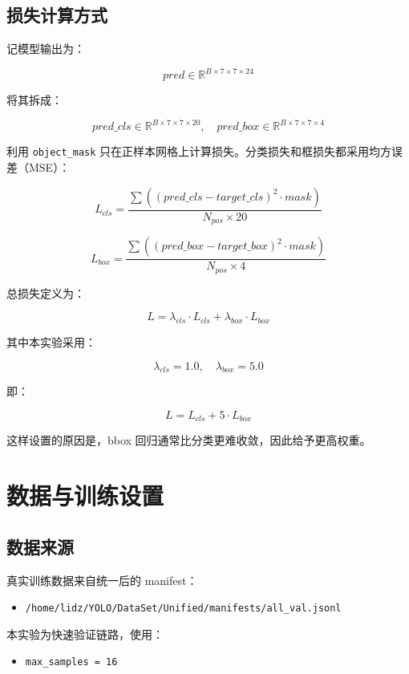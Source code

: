 \documentclass[11pt,a4paper]{article}
\begin{document}
\subsection{损失计算方式}

记模型输出为：

\[
pred \in \mathbb{R}^{B \times 7 \times 7 \times 24}
\]

将其拆成：

\[
pred\_cls \in \mathbb{R}^{B \times 7 \times 7 \times 20}, \quad pred\_box \in \mathbb{R}^{B \times 7 \times 7 \times 4}
\]

利用 \texttt{object\_mask} 只在正样本网格上计算损失。分类损失和框损失都采用均方误差（MSE）：

\[
L_{cls} = \frac{\sum ((pred\_cls - target\_cls)^2 \cdot mask)}{N_{pos} \times 20}
\]

\[
L_{box} = \frac{\sum ((pred\_box - target\_box)^2 \cdot mask)}{N_{pos} \times 4}
\]

总损失定义为：

\[
L = \lambda_{cls} \cdot L_{cls} + \lambda_{box} \cdot L_{box}
\]

其中本实验采用：

\[
\lambda_{cls}=1.0,\quad \lambda_{box}=5.0
\]

即：

\[
L = L_{cls} + 5 \cdot L_{box}
\]

这样设置的原因是，bbox 回归通常比分类更难收敛，因此给予更高权重。

\section{数据与训练设置}

\subsection{数据来源}

真实训练数据来自统一后的 manifest：

\begin{itemize}
  \item \texttt{/home/lidz/YOLO/DataSet/Unified/manifests/all\_val.jsonl}
\end{itemize}

本实验为快速验证链路，使用：

\begin{itemize}
  \item \texttt{max\_samples = 16}
\end{itemize}
\end{document}
